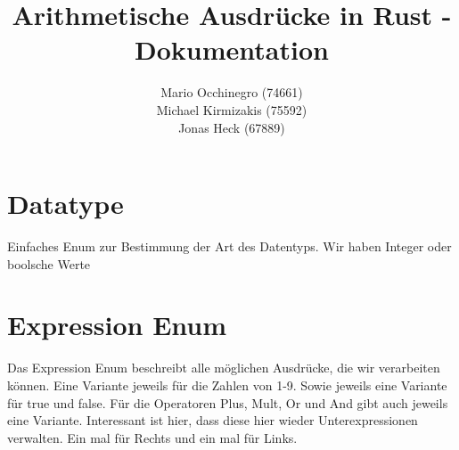 \documentclass[a4paper, 1ppt]{article}
\title{Arithmetische Ausdrücke in Rust - Dokumentation}
\date{}
\author{
		Mario Occhinegro (74661)\\
		Michael Kirmizakis (75592)\\
		Jonas Heck (67889)
}
\begin{document}
\nocite{*}
\maketitle
\newpage
\clearpage
\tableofcontents
\setcounter{page}{1}
\newpage
{}
\maketitle
\section{Datatype}
Einfaches Enum zur Bestimmung der Art des Datentyps.
Wir haben Integer oder boolsche Werte
\section{Expression Enum}
Das Expression Enum beschreibt alle möglichen Ausdrücke, die wir verarbeiten können.
Eine Variante jeweils für die Zahlen von 1-9. Sowie jeweils eine Variante für true und false.
Für die Operatoren Plus, Mult, Or und And gibt auch jeweils eine Variante. Interessant ist hier, dass 
diese hier wieder Unterexpressionen verwalten. Ein mal für Rechts und ein mal für Links.
\end{document}
